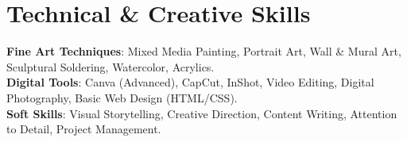 \documentclass[letterpaper,11pt]{article}
\begin{document}
\section{Technical \& Creative Skills}
 \begin{itemize}[leftmargin=0.15in, label={}]
    \small{\item{
     \textbf{Fine Art Techniques}{: Mixed Media Painting, Portrait Art, Wall \& Mural Art, Sculptural Soldering, Watercolor, Acrylics.} \\
     \textbf{Digital Tools}{: Canva (Advanced), CapCut, InShot, Video Editing, Digital Photography, Basic Web Design (HTML/CSS).} \\
     \textbf{Soft Skills}{: Visual Storytelling, Creative Direction, Content Writing, Attention to Detail, Project Management.}
    }}
 \end{itemize}

\end{document}
